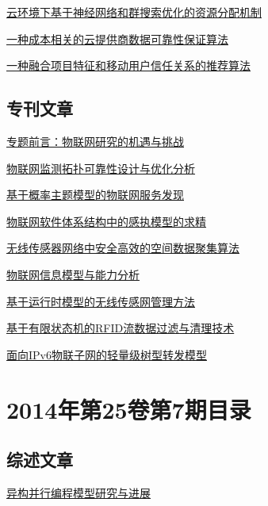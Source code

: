 \documentclass[a4paper]{article}
\begin{document}
\href{http://www.jos.org.cn/ch/reader/download_pdf.aspx?file_no=4555&year_id=2014&quarter_id=8&falg=1}{云环境下基于神经网络和群搜索优化的资源分配机制}

\href{http://www.jos.org.cn/ch/reader/download_pdf.aspx?file_no=4498&year_id=2014&quarter_id=8&falg=1}{一种成本相关的云提供商数据可靠性保证算法}

\href{http://www.jos.org.cn/ch/reader/download_pdf.aspx?file_no=4491&year_id=2014&quarter_id=8&falg=1}{一种融合项目特征和移动用户信任关系的推荐算法}

\subsection{专刊文章}
\href{http://www.jos.org.cn/ch/reader/download_pdf.aspx?file_no=4668&year_id=2014&quarter_id=8&falg=1}{专题前言：物联网研究的机遇与挑战}

\href{http://www.jos.org.cn/ch/reader/download_pdf.aspx?file_no=4660&year_id=2014&quarter_id=8&falg=1}{物联网监测拓扑可靠性设计与优化分析}

\href{http://www.jos.org.cn/ch/reader/download_pdf.aspx?file_no=4661&year_id=2014&quarter_id=8&falg=1}{基于概率主题模型的物联网服务发现}

\href{http://www.jos.org.cn/ch/reader/download_pdf.aspx?file_no=4662&year_id=2014&quarter_id=8&falg=1}{物联网软件体系结构中的感执模型的求精}

\href{http://www.jos.org.cn/ch/reader/download_pdf.aspx?file_no=4663&year_id=2014&quarter_id=8&falg=1}{无线传感器网络中安全高效的空间数据聚集算法}

\href{http://www.jos.org.cn/ch/reader/download_pdf.aspx?file_no=4664&year_id=2014&quarter_id=8&falg=1}{物联网信息模型与能力分析}

\href{http://www.jos.org.cn/ch/reader/download_pdf.aspx?file_no=4665&year_id=2014&quarter_id=8&falg=1}{基于运行时模型的无线传感网管理方法}

\href{http://www.jos.org.cn/ch/reader/download_pdf.aspx?file_no=4666&year_id=2014&quarter_id=8&falg=1}{基于有限状态机的RFID流数据过滤与清理技术}

\href{http://www.jos.org.cn/ch/reader/download_pdf.aspx?file_no=4667&year_id=2014&quarter_id=8&falg=1}{面向IPv6物联子网的轻量级树型转发模型}


\section{\textbf{2014年第25卷第7期目录}}
\subsection{综述文章}
\href{http://www.jos.org.cn/ch/reader/download_pdf.aspx?file_no=4608&year_id=2014&quarter_id=7&falg=1}{异构并行编程模型研究与进展}
\end{document}
